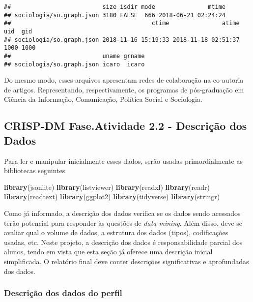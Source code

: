\documentclass[]{article}
\newenvironment{Shaded}{\begin{snugshade}}{\end{snugshade}}
\newcommand{\KeywordTok}[1]{\textcolor[rgb]{0.13,0.29,0.53}{\textbf{#1}}}
\newcommand{\NormalTok}[1]{#1}
\begin{document}
\begin{verbatim}
##                          size isdir mode               mtime
## sociologia/so.graph.json 3180 FALSE  666 2018-06-21 02:24:24
##                                        ctime               atime  uid  gid
## sociologia/so.graph.json 2018-11-16 15:19:33 2018-11-18 02:51:37 1000 1000
##                          uname grname
## sociologia/so.graph.json icaro  icaro
\end{verbatim}

Do mesmo modo, esses arquivos apresentam redes de colaboração na
co-autoria de artigos. Representando, respectivamente, os programas de
pós-graduação em Ciência da Informação, Comunicação, Política Social e
Sociologia.

\subsection{CRISP-DM Fase.Atividade 2.2 - Descrição dos
Dados}\label{crisp-dm-fase.atividade-2.2---descricao-dos-dados}

Para ler e manipular inicialmente esses dados, serão usadas
primordialmente as bibliotecas seguintes

\begin{Shaded}
\begin{Highlighting}[]
\KeywordTok{library}\NormalTok{(jsonlite)}
\KeywordTok{library}\NormalTok{(listviewer)}
\KeywordTok{library}\NormalTok{(readxl)}
\KeywordTok{library}\NormalTok{(readr)}
\KeywordTok{library}\NormalTok{(readtext)}
\KeywordTok{library}\NormalTok{(ggplot2)}
\KeywordTok{library}\NormalTok{(tidyverse)}
\KeywordTok{library}\NormalTok{(stringr)}
\end{Highlighting}
\end{Shaded}

Como já informado, a descrição dos dados verifica se os dados sendo
acessados terão potencial para responder às questões de \emph{data
mining}. Além disso, deve-se avaliar qual o volume de dados, a estrutura
dos dados (tipos), codificações usadas, etc. Neste projeto, a descrição
dos dados é responsabilidade parcial dos alunos, tendo em vista que esta
seção já oferece uma descrição inicial simplificada. O relatório final
deve conter descrições significativas e aprofundadas dos dados.

\subsubsection{Descrição dos dados do
perfil}\label{descricao-dos-dados-do-perfil}
\end{document}
